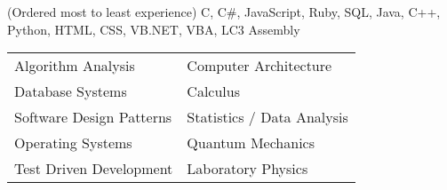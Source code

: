 \documentclass[10pt]{article}
\newcommand{\simsbullet}{{\raisebox{2pt}{\tiny $\bullet$}}\hspace{8pt}}
\begin{document}

\vskip 6pt
{ (Ordered most to least experience)}
\vskip 2pt
\hspace*{12pt} {\sffamily C, C\#, JavaScript, Ruby, SQL, Java, C++, Python, HTML, CSS, VB.NET, VBA, LC3 Assembly}

\vskip 8pt

{}

\vskip 4pt

\setlength{\leftskip}{16pt}


  \begin{tabular}{ l@{\hskip 2.2in} l }

    \simsbullet Algorithm Analysis & \simsbullet Computer Architecture \\
    \simsbullet Database Systems & \simsbullet Calculus \\
    \simsbullet Software Design Patterns & \simsbullet Statistics / Data Analysis\\
    \simsbullet Operating Systems & \simsbullet Quantum Mechanics \\
    \simsbullet Test Driven Development & \simsbullet Laboratory Physics \\

  \end{tabular}


\setlength{\leftskip}{0pt}



\end{document}

